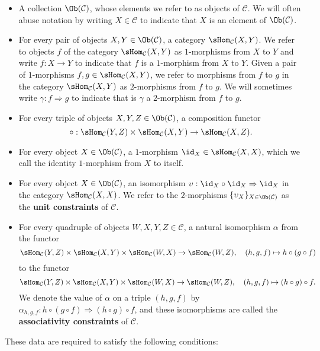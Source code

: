 \begin{itemize}
\item A collection $\Ob(\mathcal{C})$, whose elements we refer to as objects of $\mathcal{C}$. We will often abuse notation by writing $X\in\mathcal{C}$ to indicate that $X$ is an element of $\Ob(\mathcal{C})$.
\item For every pair of objects $X,Y\in\Ob(\mathcal{C})$, a category $\sHom_{\mathcal{C}}(X,Y)$. We refer to objects $f$ of the category $\sHom_{\mathcal{C}}(X,Y)$ as $1$-morphisms from $X$ to $Y$ and write $f:X\to Y$ to indicate that $f$ is a $1$-morphism from $X$ to $Y$. Given a pair of $1$-morphisms $f,g\in\sHom_{\mathcal{C}}(X,Y)$, we refer to morphisms from $f$ to $g$ in the category $\sHom_{\mathcal{C}}(X,Y)$ as $2$-morphisms from $f$ to $g$. We will sometimes write $\gamma:f\Rightarrow g$ to indicate that is $\gamma$ a $2$-morphism from $f$ to $g$.
\item For every triple of objects $X,Y,Z\in\Ob(\mathcal{C})$, a composition functor
\[\circ:\sHom_{\mathcal{C}}(Y,Z)\times\sHom_{\mathcal{C}}(X,Y)\to\sHom_{\mathcal{C}}(X,Z).\]
\item For every object $X\in\Ob(\mathcal{C})$, a $1$-morphism $\id_X\in\sHom_{\mathcal{C}}(X,X)$, which we call the identity $1$-morphism from $X$ to itself.
\item For every object $X\in\Ob(\mathcal{C})$, an isomorphism $\upsilon:\id_X\circ\id_X\Rightarrow\id_X$ in the category $\sHom_{\mathcal{C}}(X,X)$. We refer to the $2$-morphisms $\{\upsilon_X\}_{X\in\Ob(\mathcal{C})}$ as the \textbf{unit constraints} of $\mathcal{C}$.
\item For every quadruple of objects $W,X,Y,Z\in\mathcal{C}$, a natural isomorphism $\alpha$ from the functor
\[\sHom_{\mathcal{C}}(Y,Z)\times\sHom_{\mathcal{C}}(X,Y)\times\sHom_{\mathcal{C}}(W,X)\to\sHom_{\mathcal{C}}(W,Z),\quad (h,g,f)\mapsto h\circ(g\circ f)\]
to the functor
\[\sHom_{\mathcal{C}}(Y,Z)\times\sHom_{\mathcal{C}}(X,Y)\times\sHom_{\mathcal{C}}(W,X)\to\sHom_{\mathcal{C}}(W,Z),\quad (h,g,f)\mapsto (h\circ g)\circ f.\]
We denote the value of $\alpha$ on a triple $(h,g,f)$ by $\alpha_{h,g,f}:h\circ(g\circ f)\Rightarrow(h\circ g)\circ f$, and these isomorphisms are called the \textbf{associativity constraints} of $\mathcal{C}$.\par
\end{itemize}
These data are required to satisfy the following conditions:

